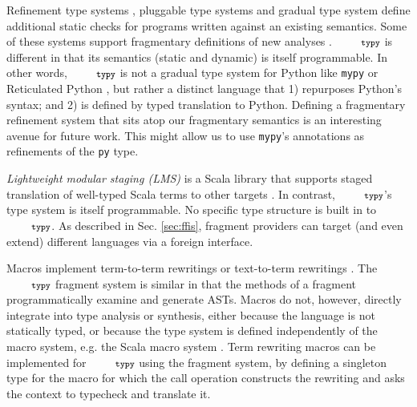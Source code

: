 \documentclass[10pt]{sigplanconf}
\newcommand{\typy}{\texttt{\footnotesize typy}}
\newcommand{\lip}[1]{\lstinline[language=Python,basicstyle=\ttfamily\footnotesize,morekeywords={with},deletendkeywords={tuple,buffer,map}]{#1}}
\newcommand{\li}[1]{\lip{#1}}
\begin{document}
Refinement type systems \cite{Freeman91}, pluggable type systems \cite{Brac04a,Andreae:2006:FIP:1167473.1167479,brown2016build,DBLP:journals/toplas/MarkstrumMEMAN10} and gradual type system \cite{Siek06a,siek2007gradual} define additional static checks for programs written against an existing semantics. Some of these systems support fragmentary definitions of new analyses \cite{DBLP:journals/toplas/MarkstrumMEMAN10,brown2016build}. $\typy$ is different in that its semantics (static and dynamic) is itself programmable. In other words, $\typy$ is not a gradual type system for Python like \texttt{mypy} \cite{mypy} or Reticulated Python \cite{DBLP:conf/dls/VitousekKSB14}, but rather a distinct language that 1) repurposes Python's syntax; and 2) is defined by typed translation to Python. %
Defining a fragmentary refinement system that sits atop our fragmentary semantics is an interesting avenue for future work. This might allow us to use \texttt{mypy}'s annotations as refinements of the \li{py} type.  %

\emph{Lightweight modular staging (LMS)} is a Scala library that supports staged translation of well-typed Scala terms to other targets \cite{Rompf:2012:LMS}. In contrast, $\typy$'s type system is itself  programmable. No specific type structure is built in to $\typy$. As described in Sec. \ref{sec:ffis}, fragment providers can target (and even extend) different languages via a foreign interface. %

Macros implement term-to-term rewritings \cite{Hart63a,DBLP:journals/jfp/FlattCDF12,ScalaMacros2013} or text-to-term rewritings \cite{DBLP:journals/toplas/Tratt08,DBLP:conf/gpce/RafkindF12}. The $\typy$ fragment system is similar in that the methods of a fragment programmatically examine and generate ASTs. Macros do not, however, directly integrate into type analysis or synthesis, either because the language is not statically typed, or because the type system is defined independently of the macro system, e.g. the Scala macro system \cite{ScalaMacros2013}. Term rewriting macros can be implemented for $\typy$ using the fragment system, by defining a singleton type for the macro for which the call operation constructs the rewriting and asks the context to typecheck and translate it.
\end{document}
